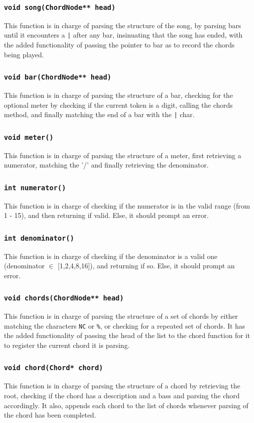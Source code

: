 \documentclass{article}
\begin{document}
\subsubsection{\texttt{void song(ChordNode** head)}}
This function is in charge of parsing the structure of the song, by parsing bars until it encounters a \texttt{|} after any bar, insinuating that the song has ended, with the added functionality of passing the pointer to bar as to record the chords being played.
\subsubsection{\texttt{void bar(ChordNode** head)}}
This function is in charge of parsing the structure of a bar, checking for the optional meter by checking if the current token is a digit, calling the chords method, and finally matching the end of a bar with the \texttt{|} char.
\subsubsection{\texttt{void meter()}}
This function is in charge of parsing the structure of a meter, first retrieving a numerator, matching the '/' and finally retrieving the denominator.
\subsubsection{\texttt{int numerator()}}
This function is in charge of checking if the numerator is in the valid range (from 1 - 15), and then returning if valid. Else, it should prompt an error. 
\subsubsection{\texttt{int denominator()}}
This function is in charge of checking if the denominator is a valid one (denominator $\in$ [1,2,4,8,16]), and returning if so. Else, it should prompt an error.
\subsubsection{\texttt{void chords(ChordNode** head)}}
This function is in charge of parsing the structure of a set of chords by either matching the characters \texttt{NC} or \texttt{\%}, or checking for a repeated set of chords. It has the added functionality of passing the head of the list to the chord function for it to register the current chord it is parsing. 
\subsubsection{\texttt{void chord(Chord* chord)}}
This function is in charge of parsing the structure of a chord by retrieving the root, checking if the chord has a description and a bass and parsing the chord accordingly. It also, appends each chord to the list of chords whenever parsing of the chord has been completed.
\end{document}
